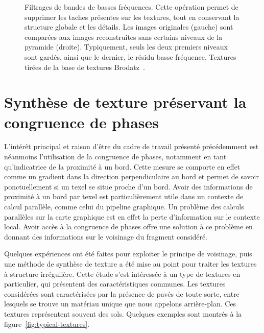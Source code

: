 \begin{figure}
    \caption[Filtrage de bandes de basses fréquences]{Filtrages de bandes de basses fréquences. Cette opération permet de supprimer les taches présentes sur les textures, tout en conservant la structure globale et les détails. Les images originales (gauche) sont comparées aux images reconstruites sans certains niveaux de la pyramide (droite). Typiquement, seuls les deux premiers niveaux sont gardés, ainsi que le dernier, le résidu basse fréquence. Textures tirées de la base de textures Brodatz~\cite{abdelmounaime_new_2013}.}
    \label{fig:filter-low-freq}
\end{figure}

\section{Synthèse de texture préservant la congruence de phases}

L'intérêt principal et raison d'être du cadre de travail présenté précédemment est néanmoins l'utilisation de la congruence de phases, notamment en tant qu'indicatrice de la proximité à un bord. Cette mesure se comporte en effet comme un gradient dans la direction perpendiculaire au bord et permet de savoir ponctuellement si un texel se situe proche d'un bord. Avoir des informations de proximité à un bord par texel est particulièrement utile dans un contexte de calcul parallèle, comme celui du pipeline graphique. Un problème des calculs parallèles sur la carte graphique est en effet la perte d'information sur le contexte local. Avoir accès à la congruence de phases offre une solution à ce problème en donnant des informations sur le voisinage du fragment considéré.

\bigskip

Quelques expériences ont été faites pour exploiter le principe de voisinage, puis une méthode de synthèse de texture a été mise au point pour traiter les textures à structure irrégulière. Cette étude s'est intéressée à un type de textures en particulier, qui présentent des caractéristiques communes. Les textures considérées sont caractérisées par la présence de pavés de toute sorte, entre lesquels se trouve un matériau unique que nous appelons arrière-plan. Ces textures représentent souvent des sols. Quelques exemples sont montrés à la figure~\ref{fig:typical-textures}.

\bigskip

